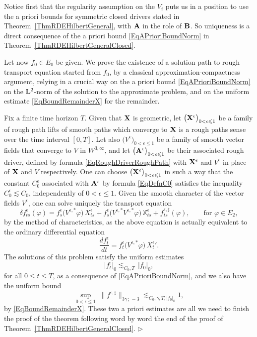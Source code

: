 \documentclass[11pt,a4paper]{amsart}
\newcommand{\bbX}{\mathbb{X}}
\renewcommand{\leq}{\leqslant}
\newcommand{\ssk}{\smallskip}
\numberwithin{equation}{section} %
\newenvironment{Dem}{%
    \begin{list}{\hspace{0.5cm}{\sc Proof --}}{%
        \setlength{\topsep}{0pt}%
        \setlength{\leftmargin}{0pt}%
        \setlength{\rightmargin}{0pt}%
        \setlength{\listparindent}{0pt}%
        \setlength{\itemindent}{0pt}%
        \setlength{\parsep}{0pt}%
        \addtolength{\leftmargin}{20pt}%
        \addtolength{\rightmargin}{0pt}%
    } \item }{\hfill{\space $\rhd$}\end{list}\smallskip}
\begin{document}
\begin{Dem}
Notice first that the regularity assumption on the $V_i$ puts us in a position to use the a priori bounds for symmetric closed drivers stated in Theorem~\ref{ThmRDEHilbertGeneral}, with $\bf A$ in the role of $\bf B$. So uniqueness is a direct consequence of the a priori bound \eqref{EqAPrioriBoundNorm} in Theorem~\ref{ThmRDEHilbertGeneralClosed}.

\ssk

Let now $f_0\in E_0$ be given. We prove the existence of a solution path to rough transport equation started from $f_0$, by a classical approximation-compactness argument, relying in a crucial way on the a priori bound \eqref{EqAPrioriBoundNorm} on the $\mathbb{L}^2$-norm of the solution to the approximate problem, and on the uniform estimate \eqref{EqBoundRemainderX} for the remainder. 

\ssk

Fix a finite time horizon $T$.
Given that ${\bf X}$ is geometric, let $\big({\bfX}^\epsilon\big)_{0<\epsilon\leq 1}$ be a family of rough path lifts of smooth paths which converge to ${\bf X}$ is a rough paths sense over the time interval $[0,T]$. Let also $\big(V^\epsilon\big)_{0<\epsilon\leq 1}$ be a family of smooth vector fields that converge to $V$ in $W^{3,\infty}$, and let $\big({\bf A}^\epsilon\big)_{0<\epsilon\leq 1}$ be their associated rough driver, defined by formula \eqref{EqRoughDriverRoughPath} with ${{\bf X}}^\epsilon$ and $V^\epsilon$ in place of ${\bf X}$ and $V$ respectively. One can choose $\big({\bfX}^\epsilon\big)_{0<\epsilon\leq 1}$ in such a way that the constant $C_0^\epsilon$ associated with ${\bf A}^\epsilon$ by formula \eqref{EqDefnC0} satisfies the inequality $C_0^\epsilon\lesssim C_0$, independently of $0<\epsilon\leq 1$. Given the smooth character of the vector fields $V^\epsilon$, one can solve uniquely the transport equation
\begin{equation*}
\delta f^\epsilon_{ts}(\varphi) = f^\epsilon_s\big(V^{\epsilon,\ast} \varphi\big)\,X^\epsilon_{ts} + f^\epsilon_s\big(V^{\epsilon,\ast}V^{\epsilon,\ast}\varphi\big)\,\bbX^\epsilon_{ts} + f^{\epsilon, \sharp}_{ts}(\varphi), \quad\quad \textrm{for } \varphi\in E_2,
\end{equation*}
by the method of characteristics, as the above equation is actually equivalent to the ordinary differential equation
$$ 
\frac{df^\epsilon_t}{dt} = f^\epsilon_t\big(V^{\epsilon,\ast}\varphi\big)\,{X^\epsilon_t}'.
$$
The solutions of this problem satisfy the uniform estimates
\begin{equation*}
\big| f^\epsilon_t \big|_0 \lesssim_{C_0,T}\,\big| f_0 \big|_0,
\end{equation*}
for all $0\leq t\leq T$, as a consequence of \eqref{EqAPrioriBoundNorm}, and we also have the uniform bound
\begin{equation*}
\sup_{0<\epsilon\leq 1}\;\big\| f^{\epsilon, \sharp} \big\|_{3 \gamma\,;\, - 3} \lesssim_{C_0, \gamma, T,|f_0|_0} 1,
\end{equation*}
by \eqref{EqBoundRemainderX}. These two a priori estimates are all we need to finish the proof of the theorem following word by word the end of the proof of Theorem~\ref{ThmRDEHilbertGeneralClosed}. 
\end{Dem}
\end{document}
